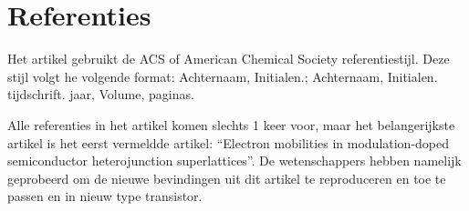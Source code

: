 \documentclass[11pt]{article}
\begin{document}
\section{Referenties}
Het artikel gebruikt de ACS of American Chemical Society referentiestijl. Deze stijl volgt he volgende format: Achternaam, Initialen.; Achternaam, Initialen. tijdschrift. jaar, Volume, paginas. 

Alle referenties in het artikel komen slechts 1 keer voor, maar het belangerijkste artikel is het eerst vermeldde artikel: ``Electron mobilities in modulation-doped semiconductor heterojunction superlattices''. De wetenschappers hebben namelijk geprobeerd om de nieuwe bevindingen uit dit artikel te reproduceren en toe te passen en in nieuw type transistor.

%
%

\appendix
\end{document}
